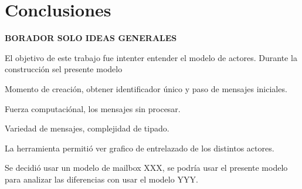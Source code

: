 \chapter{Conclusiones}

\textbf{BORADOR SOLO IDEAS GENERALES}

El objetivo de este trabajo fue intenter entender el modelo de actores. Durante la construcción sel presente modelo 

Momento de creación, obtener identificador único y paso de mensajes iniciales.

Fuerza computaciónal, los mensajes sin procesar.

Variedad de mensajes, complejidad de tipado.

La herramienta \FDR permitió ver grafico de entrelazado de los distintos actores.

Se decidió usar un modelo de mailbox XXX, se podría usar el presente modelo para analizar las diferencias con usar el modelo YYY.


